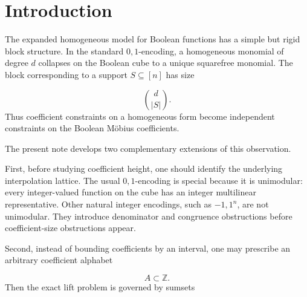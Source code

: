\documentclass[11pt]{article}
\theoremstyle{definition}
\begin{document}
\begin{abstract}
\[
A_H^{\mathrm{odd}}={-H,-H+2,\dots,H},
\qquad H\ \text{odd},
\]
Lucas' theorem produces an arithmetically oscillating universal degree threshold:

\[
D_{H,\mathrm{odd}}(n)
=
Q(n)
\left\lceil
\frac{D_H(n)}{Q(n)}
\right\rceil,
\qquad
Q(n)=2^{\lceil\log_2(n+1)\rceil},
\]
where

\[
D_H(n)=\min\left\{d:H\binom dn\ge2^n\right\}.
\]
Finally, for a uniformly random Boolean function $G_n$, we compute the typical exact ternary sparsity:

\[
\Sigma_{\mathrm{ex},H}(G_n)
=
\left(\frac1H\sqrt{\frac2\pi}+o_{\mathbb{P}}(1)\right)(1+\sqrt2)^n
\]
for each fixed $H\ge1$, in contrast with the parity worst case $3^n$.

The results are elementary but exact. They are not coordinate-invariant statements about polynomial threshold functions. They are invariants of explicit integer presentation models.

\end{abstract}

\section{Introduction}
The expanded homogeneous model for Boolean functions has a simple but rigid block structure. In the standard ${0,1}$-encoding, a homogeneous monomial of degree $d$ collapses on the Boolean cube to a unique squarefree monomial. The block corresponding to a support $S\subseteq[n]$ has size

\[
\binom d{|S|}.
\]
Thus coefficient constraints on a homogeneous form become independent constraints on the Boolean Möbius coefficients.

The present note develops two complementary extensions of this observation.

First, before studying coefficient height, one should identify the underlying interpolation lattice. The usual ${0,1}$-encoding is special because it is unimodular: every integer-valued function on the cube has an integer multilinear representative. Other natural integer encodings, such as ${-1,1}^n$, are not unimodular. They introduce denominator and congruence obstructions before coefficient-size obstructions appear.

Second, instead of bounding coefficients by an interval, one may prescribe an arbitrary coefficient alphabet

\[
A\subset\mathbb{Z}.
\]
Then the exact lift problem is governed by sumsets
\end{document}
